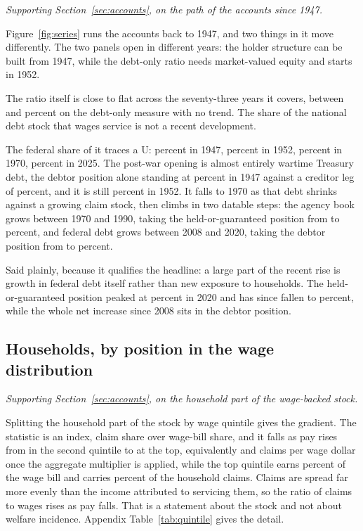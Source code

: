 \emph{Supporting Section~\ref{sec:accounts}, on the path of the accounts since 1947.}

Figure~\ref{fig:series} runs the accounts back to 1947, and two things in it move differently.
The two panels open in different years: the holder structure can be built from 1947, while the
debt-only ratio needs market-valued equity and starts in 1952.

The ratio itself is close to flat across the seventy-three years it covers, between
 and  percent on the debt-only measure with
no trend. The share of the national debt stock that wages service is not a recent development.

The federal share of it traces a U:  percent in 1947,
 percent in 1952,  percent in 1970,
 percent in 2025. The post-war opening is almost entirely wartime Treasury
debt, the debtor position alone standing at  percent in 1947 against a
creditor leg of  percent, and it is still
 percent in 1952. It falls to 1970 as that debt shrinks against a growing claim
stock, then climbs in two datable steps: the agency book grows between 1970 and 1990, taking the
held-or-guaranteed position from  to  percent, and federal
debt grows between 2008 and 2020, taking the debtor position from  to
 percent.

Said plainly, because it qualifies the headline: a large part of the recent rise is growth in
federal debt itself rather than new exposure to households. The held-or-guaranteed position peaked
at  percent in 2020 and has since fallen to  percent,
while the whole net increase since 2008 sits in the debtor position.

\subsection{Households, by position in the wage distribution}

\emph{Supporting Section~\ref{sec:accounts}, on the household part of the wage-backed stock.}

Splitting the household part of the stock by wage quintile gives the gradient. The statistic is
an index, claim share over wage-bill share, and it falls as pay rises from  in
the second quintile to  at the top, equivalently  and
 claims per wage dollar once the aggregate multiplier is applied, while the top quintile earns  percent of
the wage bill and carries  percent of the household claims. Claims are
spread far more evenly than the income attributed to servicing them, so the ratio of claims to
wages rises as pay falls. That is a statement about the stock and not about welfare incidence. Appendix Table~\ref{tab:quintile} gives
the detail.


